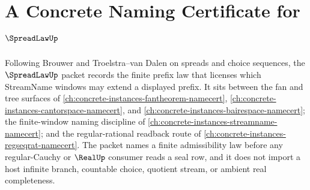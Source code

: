 \chapter{A Concrete Naming Certificate for $\SpreadLawUp$}
\label{ch:concrete-instances-spread-law-namecert}

Following Brouwer and Troelstra--van Dalen on spreads and choice sequences, the $\SpreadLawUp$ packet records the finite prefix law that licenses which StreamName windows may extend a displayed prefix. It sits between the fan and tree surfaces of \autoref{ch:concrete-instances-fantheorem-namecert}, \autoref{ch:concrete-instances-cantorspace-namecert}, and \autoref{ch:concrete-instances-bairespace-namecert}; the finite-window naming discipline of \autoref{ch:concrete-instances-streamname-namecert}; and the regular-rational readback route of \autoref{ch:concrete-instances-regseqrat-namecert}. The packet names a finite admissibility law before any regular-Cauchy or $\RealUp$ consumer reads a seal row, and it does not import a host infinite branch, countable choice, quotient stream, or ambient real completeness.

